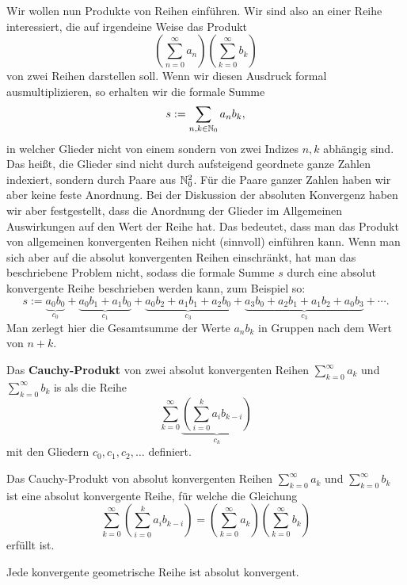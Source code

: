 \begin{bem}
	Wir wollen nun Produkte von Reihen einführen. Wir sind also an einer Reihe interessiert, die auf irgendeine Weise das Produkt 
	\[
		\left( \sum_{n=0}^\infty a_n \right) \left( \sum_{k=0}^\infty b_k \right) 
	\]
	von zwei Reihen darstellen soll. Wenn wir diesen Ausdruck formal ausmultiplizieren, so erhalten wir die formale Summe
	\[
		s:=\sum_{n,k \in \mathbb{N}_0} a_n b_k,
	\]
	in welcher Glieder nicht von einem sondern von zwei Indizes $n,k$ abhängig sind. Das heißt, die Glieder sind nicht durch aufsteigend geordnete ganze Zahlen indexiert, sondern durch Paare aus $\mathbb{N}_0^2$. Für die Paare ganzer Zahlen haben wir aber keine feste Anordnung. Bei der Diskussion der absoluten Konvergenz haben wir aber festgestellt, dass die Anordnung der Glieder im Allgemeinen Auswirkungen auf den Wert der Reihe hat. Das bedeutet, dass man das Produkt von allgemeinen konvergenten Reihen nicht (sinnvoll) einführen kann. Wenn man sich aber auf die absolut konvergenten Reihen einschränkt, hat man das beschriebene Problem nicht, sodass die formale Summe $s$ durch eine absolut konvergente Reihe beschrieben werden kann, zum Beispiel so: 
	\[
		s:= \underbrace{a_0 b_0}_{c_0} + \underbrace{a_0 b_1 + a_1 b_0}_{c_1} + \underbrace{a_0 b_2 + a_1 b_1 + a_2 b_0}_{c_3} + \underbrace{a_3 b_0 + a_2 b_1 + a_1 b_2 + a_0 b_3}_{c_3} + \cdots  . 
	\]
	Man zerlegt hier die Gesamtsumme der Werte $a_n b_k$ in Gruppen nach dem Wert von $n+k$. 
\end{bem} 

\begin{defn} Das \textbf{Cauchy-Produkt} von zwei absolut konvergenten Reihen $\sum_{k=0}^\infty a_k$ und $\sum_{k=0}^\infty b_k$ is als die Reihe
\[
	\sum_{k=0}^\infty \underbrace{\left( \sum_{i=0}^k a_i b_{k-i} \right)}_{c_k}
\]
mit den Gliedern $c_0,c_1,c_2,\ldots$ definiert. 
\end{defn} 

\begin{thm} 
	Das Cauchy-Produkt von absolut konvergenten Reihen $\sum_{k=0}^\infty a_k$ und $\sum_{k=0}^\infty b_k$ ist eine absolut konvergente Reihe, für welche die Gleichung
	\[
		\sum_{k=0}^\infty \left( \sum_{i=0}^k a_i b_{k-i} \right) = \left( \sum_{k=0}^\infty a_k \right) \left( \sum_{k=0}^ \infty b_k \right) 
	\]
	erfüllt ist. 
\end{thm} 

\begin{bsp} 
	Jede konvergente geometrische Reihe ist absolut konvergent. 
\end{bsp} 

